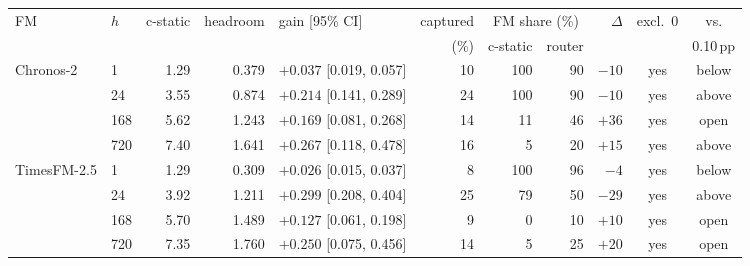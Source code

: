 \begin{tabular}{llrrlrrrrcc}
\toprule
FM & $h$ & c-static & headroom & gain [95\% CI] & captured & \multicolumn{2}{c}{FM share (\%)} & $\Delta$ & excl.\ 0 & vs. \\
 & & & & & (\%) & c-static & router & & & 0.10\,pp \\
\midrule
\multirow{4}{*}{Chronos-2}
 & 1 & 1.29 & 0.379 & $+0.037$ [0.019, 0.057] & 10 & 100 & 90 & $-10$ & yes & below \\
 & 24 & 3.55 & 0.874 & $+0.214$ [0.141, 0.289] & 24 & 100 & 90 & $-10$ & yes & above \\
 & 168 & 5.62 & 1.243 & $+0.169$ [0.081, 0.268] & 14 & 11 & 46 & $+36$ & yes & open \\
 & 720 & 7.40 & 1.641 & $+0.267$ [0.118, 0.478] & 16 & 5 & 20 & $+15$ & yes & above \\
\midrule
\multirow{4}{*}{TimesFM-2.5}
 & 1 & 1.29 & 0.309 & $+0.026$ [0.015, 0.037] & 8 & 100 & 96 & $-4$ & yes & below \\
 & 24 & 3.92 & 1.211 & $+0.299$ [0.208, 0.404] & 25 & 79 & 50 & $-29$ & yes & above \\
 & 168 & 5.70 & 1.489 & $+0.127$ [0.061, 0.198] & 9 & 0 & 10 & $+10$ & yes & open \\
 & 720 & 7.35 & 1.760 & $+0.250$ [0.075, 0.456] & 14 & 5 & 25 & $+20$ & yes & open \\
\bottomrule
\end{tabular}
